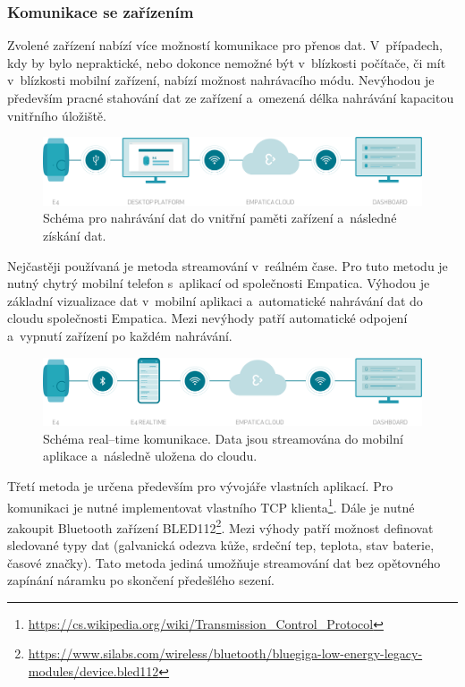         \subsubsection{Komunikace se zařízením}
        Zvolené zařízení nabízí více možností komunikace pro přenos dat. V~případech, kdy by bylo nepraktické, nebo dokonce nemožné být v~blízkosti počítače, či mít v~blízkosti mobilní zařízení, nabízí možnost nahrávacího módu. Nevýhodou je především pracné stahování dat ze zařízení a~omezená délka nahrávání kapacitou vnitřního úložiště. 
        
        \begin{figure}[H]
            \centering
            \includegraphics[width=\textwidth]{obrazky-figures/e4-recording_system.png}
            \caption{Schéma pro nahrávání dat do vnitřní paměti zařízení a~následné získání dat.}
            \label{fig:recording_fig}
        \end{figure}
        
        Nejčastěji používaná je metoda streamování v~reálném čase. Pro tuto metodu je nutný chytrý mobilní telefon s~aplikací od společnosti Empatica. Výhodou je základní vizualizace dat v~mobilní aplikaci a~automatické nahrávání dat do cloudu společnosti Empatica. Mezi nevýhody patří automatické odpojení a~vypnutí zařízení po každém nahrávání. 
        
        \begin{figure}[H]
            \centering
            \includegraphics[width=\textwidth]{obrazky-figures/e4-streaming_system.png}
            \caption{Schéma real--time komunikace. Data jsou streamována do mobilní aplikace a~následně uložena do cloudu.}
            \label{fig:stream_fig}
        \end{figure}
        
        Třetí metoda je určena především pro vývojáře vlastních aplikací. Pro komunikaci je nutné implementovat vlastního TCP klienta\footnote{\url{https://cs.wikipedia.org/wiki/Transmission_Control_Protocol}}. Dále je nutné zakoupit Bluetooth zařízení BLED112\footnote{\url{https://www.silabs.com/wireless/bluetooth/bluegiga-low-energy-legacy-modules/device.bled112}}. Mezi výhody patří možnost definovat sledované typy dat (galvanická odezva kůže, srdeční tep, teplota, stav baterie, časové značky). Tato metoda jediná umožňuje streamování dat bez opětovného zapínání náramku po skončení předešlého sezení.
    
